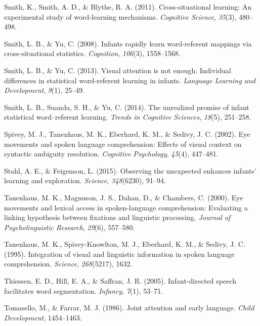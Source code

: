 \documentclass[oneside]{report}
\begin{document}
\hypertarget{ref-smith2011cross}{}
Smith, K., Smith, A. D., \& Blythe, R. A. (2011). Cross-situational
learning: An experimental study of word-learning mechanisms.
\emph{Cognitive Science}, \emph{35}(3), 480--498.

\hypertarget{ref-smith2008infants}{}
Smith, L. B., \& Yu, C. (2008). Infants rapidly learn word-referent
mappings via cross-situational statistics. \emph{Cognition},
\emph{106}(3), 1558--1568.

\hypertarget{ref-smith2013visual}{}
Smith, L. B., \& Yu, C. (2013). Visual attention is not enough:
Individual differences in statistical word-referent learning in infants.
\emph{Language Learning and Development}, \emph{9}(1), 25--49.

\hypertarget{ref-smith2014unrealized}{}
Smith, L. B., Suanda, S. H., \& Yu, C. (2014). The unrealized promise of
infant statistical word--referent learning. \emph{Trends in Cognitive
Sciences}, \emph{18}(5), 251--258.

\hypertarget{ref-spivey2002eye}{}
Spivey, M. J., Tanenhaus, M. K., Eberhard, K. M., \& Sedivy, J. C.
(2002). Eye movements and spoken language comprehension: Effects of
visual context on syntactic ambiguity resolution. \emph{Cognitive
Psychology}, \emph{45}(4), 447--481.

\hypertarget{ref-stahl2015observing}{}
Stahl, A. E., \& Feigenson, L. (2015). Observing the unexpected enhances
infants' learning and exploration. \emph{Science}, \emph{348}(6230),
91--94.

\hypertarget{ref-tanenhaus2000eye}{}
Tanenhaus, M. K., Magnuson, J. S., Dahan, D., \& Chambers, C. (2000).
Eye movements and lexical access in spoken-language comprehension:
Evaluating a linking hypothesis between fixations and linguistic
processing. \emph{Journal of Psycholinguistic Research}, \emph{29}(6),
557--580.

\hypertarget{ref-tanenhaus1995integration}{}
Tanenhaus, M. K., Spivey-Knowlton, M. J., Eberhard, K. M., \& Sedivy, J.
C. (1995). Integration of visual and linguistic information in spoken
language comprehension. \emph{Science}, \emph{268}(5217), 1632.

\hypertarget{ref-thiessen2005infant}{}
Thiessen, E. D., Hill, E. A., \& Saffran, J. R. (2005). Infant-directed
speech facilitates word segmentation. \emph{Infancy}, \emph{7}(1),
53--71.

\hypertarget{ref-tomasello1986joint}{}
Tomasello, M., \& Farrar, M. J. (1986). Joint attention and early
language. \emph{Child Development}, 1454--1463.
\end{document}

